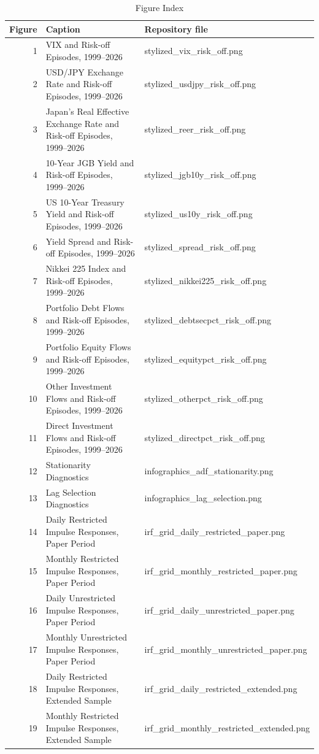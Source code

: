 \begin{table}[H]
  \centering
  \caption{Figure Index}
  \label{tab:figure_index}
  \small
  \begin{tabularx}{\textwidth}{@{}r X l@{}}
    \toprule
    Figure & Caption & Repository file \\
    \midrule
    1 & VIX and Risk-off Episodes, 1999--2026 & stylized\_vix\_risk\_off.png \\
    2 & USD/JPY Exchange Rate and Risk-off Episodes, 1999--2026 & stylized\_usdjpy\_risk\_off.png \\
    3 & Japan's Real Effective Exchange Rate and Risk-off Episodes, 1999--2026 & stylized\_reer\_risk\_off.png \\
    4 & 10-Year JGB Yield and Risk-off Episodes, 1999--2026 & stylized\_jgb10y\_risk\_off.png \\
    5 & US 10-Year Treasury Yield and Risk-off Episodes, 1999--2026 & stylized\_us10y\_risk\_off.png \\
    6 & Yield Spread and Risk-off Episodes, 1999--2026 & stylized\_spread\_risk\_off.png \\
    7 & Nikkei 225 Index and Risk-off Episodes, 1999--2026 & stylized\_nikkei225\_risk\_off.png \\
    8 & Portfolio Debt Flows and Risk-off Episodes, 1999--2026 & stylized\_debtsecpct\_risk\_off.png \\
    9 & Portfolio Equity Flows and Risk-off Episodes, 1999--2026 & stylized\_equitypct\_risk\_off.png \\
    10 & Other Investment Flows and Risk-off Episodes, 1999--2026 & stylized\_otherpct\_risk\_off.png \\
    11 & Direct Investment Flows and Risk-off Episodes, 1999--2026 & stylized\_directpct\_risk\_off.png \\
    12 & Stationarity Diagnostics & infographics\_adf\_stationarity.png \\
    13 & Lag Selection Diagnostics & infographics\_lag\_selection.png \\
    14 & Daily Restricted Impulse Responses, Paper Period & irf\_grid\_daily\_restricted\_paper.png \\
    15 & Monthly Restricted Impulse Responses, Paper Period & irf\_grid\_monthly\_restricted\_paper.png \\
    16 & Daily Unrestricted Impulse Responses, Paper Period & irf\_grid\_daily\_unrestricted\_paper.png \\
    17 & Monthly Unrestricted Impulse Responses, Paper Period & irf\_grid\_monthly\_unrestricted\_paper.png \\
    18 & Daily Restricted Impulse Responses, Extended Sample & irf\_grid\_daily\_restricted\_extended.png \\
    19 & Monthly Restricted Impulse Responses, Extended Sample & irf\_grid\_monthly\_restricted\_extended.png \\
    \bottomrule
  \end{tabularx}
\end{table}
